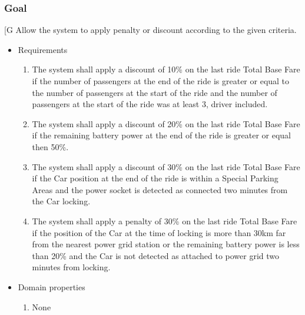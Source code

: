     \subsubsection{Goal }
    {[}G\arabic{goalctr}{]}
    Allow the system to apply penalty or discount according to the given criteria.
    \begin{itemize}
        \item Requirements
        \begin{enumerate}[REQ]
    			\item The system shall apply a discount of 10\% on the last ride Total Base Fare if the number of passengers at the end of the ride is greater or equal to the number of passengers at the start of the ride and the number of passengers at the start of the ride was at least 3, driver included.
    			\item The system shall apply a discount of 20\% on the last ride Total Base Fare if the remaining battery power at the end of the ride is greater or equal then 50\%.
    			\item The system shall apply a discount of 30\% on the last ride Total Base Fare if the Car position at the end of the ride is within a Special Parking Areas and the power socket is detected as connected two minutes from the Car locking.
    			\item The system shall apply a penalty of 30\% on the last ride Total Base Fare if the position of the Car at the time of locking is more than 30km far from the nearest power grid station or the remaining battery power is less than 20\% and the Car is not detected as attached to power grid two minutes from locking.
        \end{enumerate}
        \item Domain properties
        \begin{enumerate}[PRO]
    	        \item None
    	\end{enumerate}
    \end{itemize} 

